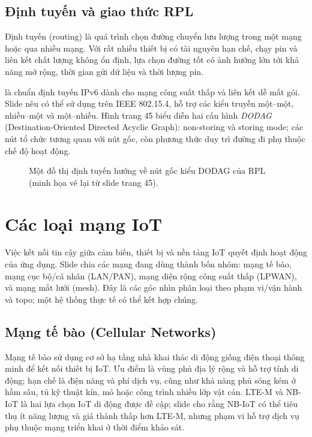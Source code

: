 \subsection{Định tuyến và giao thức RPL}
Định tuyến (routing) là quá trình chọn đường chuyển lưu lượng trong một mạng hoặc qua nhiều mạng. Với rất nhiều thiết bị có tài nguyên hạn chế, chạy pin và liên kết chất lượng không ổn định, lựa chọn đường tốt có ảnh hưởng lớn tới khả năng mở rộng, thời gian gửi dữ liệu và thời lượng pin.

 là chuẩn định tuyến IPv6 dành cho mạng công suất thấp và liên kết dễ mất gói. Slide nêu có thể sử dụng trên IEEE 802.15.4, hỗ trợ các kiểu truyền một--một, nhiều--một và một--nhiều. Hình trang 45 biểu diễn hai cấu hình \emph{DODAG} (Destination-Oriented Directed Acyclic Graph): non-storing và storing mode; các nút tổ chức tương quan với nút gốc, còn phương thức duy trì đường đi phụ thuộc chế độ hoạt động. 

\begin{figure}[htbp]\centering
{}
\caption{Một đồ thị định tuyến hướng về nút gốc kiểu DODAG của RPL (minh họa vẽ lại từ slide trang 45).}\end{figure}

\section{Các loại mạng IoT}
Việc kết nối tin cậy giữa cảm biến, thiết bị và nền tảng IoT quyết định hoạt động của ứng dụng. Slide chia các mạng đang dùng thành bốn nhóm: mạng tế bào, mạng cục bộ/cá nhân (LAN/PAN), mạng diện rộng công suất thấp (LPWAN), và mạng mắt lưới (mesh). Đây là các góc nhìn phân loại theo phạm vi/vận hành và topo; một hệ thống thực tế có thể kết hợp chúng. 

\subsection{Mạng tế bào (Cellular Networks)}
Mạng tế bào sử dụng cơ sở hạ tầng nhà khai thác di động giống điện thoại thông minh để kết nối thiết bị IoT. Ưu điểm là vùng phủ địa lý rộng và hỗ trợ tính di động; hạn chế là điện năng và phí dịch vụ, cũng như khả năng phủ sóng kém ở hầm sâu, tủ kỹ thuật kín, mỏ hoặc công trình nhiều lớp vật cản. LTE-M và NB-IoT là hai lựa chọn IoT di động được đề cập; slide cho rằng NB-IoT có thể tiêu thụ ít năng lượng và giá thành thấp hơn LTE-M, nhưng phạm vi hỗ trợ dịch vụ phụ thuộc mạng triển khai ở thời điểm khảo sát. 

